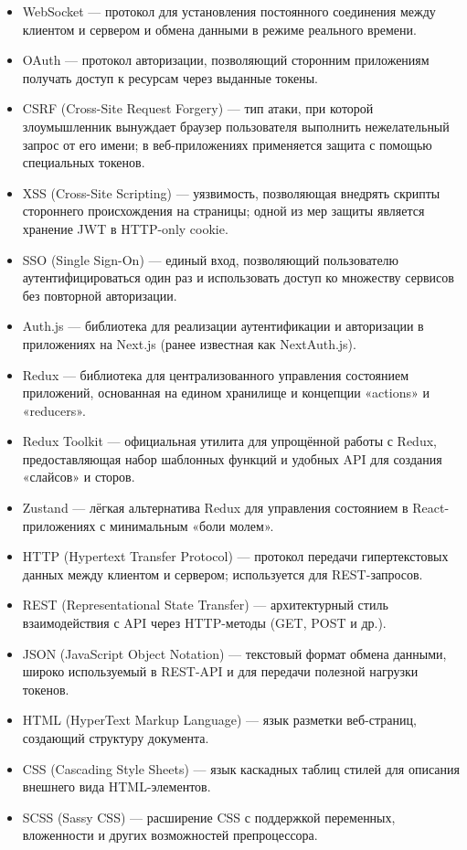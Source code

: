 \begin{itemize}
  \item WebSocket — протокол для установления постоянного соединения между клиентом и сервером и обмена данными в режиме реального времени.
  \item OAuth — протокол авторизации, позволяющий сторонним приложениям получать доступ к ресурсам через выданные токены.
  \item CSRF (Cross-Site Request Forgery) — тип атаки, при которой злоумышленник вынуждает браузер пользователя выполнить нежелательный запрос от его имени; в веб-приложениях применяется защита с помощью специальных токенов.
  \item XSS (Cross-Site Scripting) — уязвимость, позволяющая внедрять скрипты стороннего происхождения на страницы; одной из мер защиты является хранение JWT в HTTP-only cookie.
  \item SSO (Single Sign-On) — единый вход, позволяющий пользователю аутентифицироваться один раз и использовать доступ ко множеству сервисов без повторной авторизации.
  \item Auth.js — библиотека для реализации аутентификации и авторизации в приложениях на Next.js (ранее известная как NextAuth.js).
  \item Redux — библиотека для централизованного управления состоянием приложений, основанная на едином хранилище и концепции «actions» и «reducers».
  \item Redux Toolkit — официальная утилита для упрощённой работы с Redux, предоставляющая набор шаблонных функций и удобных API для создания «слайсов» и сторов.
  \item Zustand — лёгкая альтернатива Redux для управления состоянием в React-приложениях с минимальным «боли молем».
  \item HTTP (Hypertext Transfer Protocol) — протокол передачи гипертекстовых данных между клиентом и сервером; используется для REST-запросов.
  \item REST (Representational State Transfer) — архитектурный стиль взаимодействия с API через HTTP-методы (GET, POST и др.).
  \item JSON (JavaScript Object Notation) — текстовый формат обмена данными, широко используемый в REST-API и для передачи полезной нагрузки токенов.
  \item HTML (HyperText Markup Language) — язык разметки веб-страниц, создающий структуру документа.
  \item CSS (Cascading Style Sheets) — язык каскадных таблиц стилей для описания внешнего вида HTML-элементов.
  \item SCSS (Sassy CSS) — расширение CSS с поддержкой переменных, вложенности и других возможностей препроцессора.

\end{itemize}

